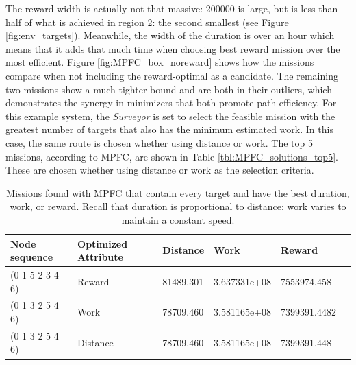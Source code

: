 \documentclass{tamuccthesis}
\begin{document}
The reward width is actually not that massive: 200000 is large, but is less than half of what is achieved in region 2: the second smallest (see Figure \ref{fig:env_targets}). Meanwhile, the width of the duration is over an hour which means that it adds that much time when choosing best reward mission over the most efficient. Figure \ref{fig:MPFC_box_noreward} shows how the missions compare when not including the reward-optimal as a candidate. The remaining two missions show a much tighter bound and are both in their outliers, which demonstrates the synergy in minimizers that both promote path efficiency. For this example system, the \textit{Surveyor} is set to select the feasible mission with the greatest number of targets that also has the minimum estimated work. In this case, the same route is chosen whether using distance or work. The top 5 missions, according to MPFC, are shown in Table \ref{tbl:MPFC_solutions_top5}. These are chosen whether using distance or work as the selection criteria.

\begin{table}[H]\small
    \centering
    \begin{tabular}{|l|l|l|l|l|l|}
\hline
Node sequence & Optimized Attribute & Distance & Work & Reward \\
\hline
(0 1 5 2 3 4 6) & Reward   & 81489.301 & 3.637331e+08 & 7553974.458 \\
\hline
(0 1 3 2 5 4 6) & Work     & 78709.460 & 3.581165e+08 & 7399391.4482 \\
\hline
(0 1 3 2 5 4 6) & Distance & 78709.460 & 3.581165e+08  & 7399391.448 \\
\hline
    \end{tabular}
    \caption[Mission Planner Fully-Connected results.]{Missions found with MPFC that contain every target and have the best duration, work, or reward. Recall that duration is proportional to distance: work varies to maintain a constant speed.}
    \label{tbl:MPFC_solutions}
\end{table}
\end{document}
